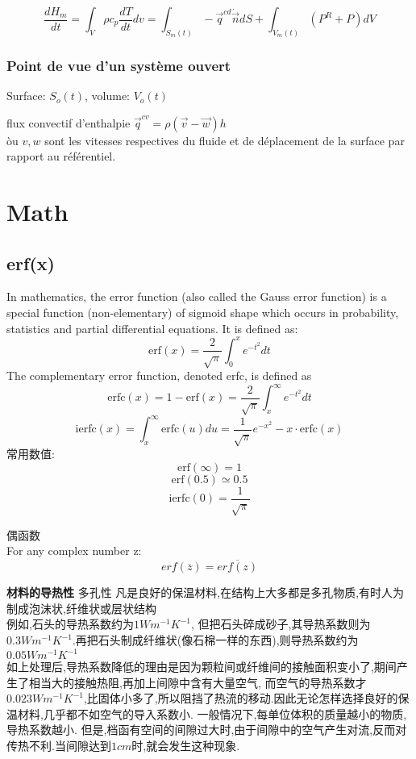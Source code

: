 \documentclass{article}
\begin{document}
\begin{equation}
\dfrac{d H_m}{dt}
= \int_V \rho c_p\frac{dT}{dt}dv
= \int_{S_m(t)} -\vec{q}^{cd} \dot \vec{n}dS + \int_{V_m(t)} (P^{R} + P)dV
\end{equation}

\subsubsection{Point de vue d'un syst\`eme ouvert}
Surface: $S_o(t)$, volume: $V_o(t)$

flux convectif d'enthalpie $\vec{q}^{cv} = \rho(\vec{v} - \vec{w})h$\\
\`ou $v, w$ sont les vitesses respectives du fluide et de d\'eplacement de la surface par rapport au r\'ef\'erentiel.

\section{Math}
\subsection{erf(x)}
In mathematics, the error function (also called the Gauss error function) is a special function (non-elementary) of sigmoid shape which occurs in probability, statistics and partial differential equations. It is defined as:
\begin{equation}
 \mbox{erf}(x)=\frac{2}{\sqrt{\pi}}\int_{0}^{x}e^{-t^2}dt
\end{equation}
The complementary error function, denoted erfc, is defined as
\begin{equation}
 \mbox{erfc}(x)=1-\mbox{erf}(x)=\frac{2}{\sqrt{\pi}}\int_{x}^{\infty }e^{-t^2}dt
\end{equation}
$$\mbox{ierfc}(x)=\int_x^{\infty}\mbox{erfc}(u)du=\frac{ 1}{\sqrt{\pi}}e^{-x^2} -  x \cdot \mbox{erfc}(x)$$
常用数值:
$$\mbox{erf}(\infty)=1$$
$$\mbox{erf}(0.5) \simeq 0.5$$
$$\mbox{ierfc}(0)=\frac{ 1}{\sqrt{\pi}}$$

偶函数\\
For any complex number z:
\begin{equation}
 erf(\overline{z})=\overline{erf(z)}
\end{equation}

\textbf{材料的导热性}
多孔性 凡是良好的保温材料,在结构上大多都是多孔物质,有时人为制成泡沫状,纤维状或层状结构 \\
例如,石头的导热系数约为$1Wm^{-1}K^{-1}$, 但把石头碎成砂子,其导热系数则为$0.3Wm^{-1}K^{-1}$.再把石头制成纤维状(像石棉一样的东西),则导热系数约为$0.05Wm^{-1}K^{-1}$ \\
如上处理后,导热系数降低的理由是因为颗粒间或纤维间的接触面积变小了,期间产生了相当大的接触热阻,再加上间隙中含有大量空气,
而空气的导热系数才$0.023Wm^{-1}K^{-1}$,比固体小多了,所以阻挡了热流的移动.因此无论怎样选择良好的保温材料,几乎都不如空气的导入系数小.
一般情况下,每单位体积的质量越小的物质,导热系数越小. 但是,档函有空间的间隙过大时,由于间隙中的空气产生对流,反而对传热不利.当间隙达到$1cm$时,就会发生这种现象.
\end{document}
